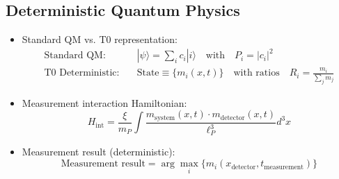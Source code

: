 \documentclass[12pt,a4paper]{article}
\begin{document}
	\subsection{Deterministic Quantum Physics}
	\begin{itemize}
		\item Standard QM vs. T0 representation:
		\begin{align}
			\text{Standard QM:} &\quad |\psi\rangle = \sum_i c_i |i\rangle \quad \text{with} \quad P_i = |c_i|^2 \\
			\text{T0 Deterministic:} &\quad \text{State} \equiv \{m_i(x,t)\} \quad \text{with ratios} \quad R_i = \frac{m_i}{\sum_j m_j}
		\end{align}
		
		\item Measurement interaction Hamiltonian:
		\begin{equation}
			H_{\text{int}} = \frac{\xi}{m_P} \int \frac{m_{\text{system}}(x,t) \cdot m_{\text{detector}}(x,t)}{\ell_P^3} d^3x
		\end{equation}
		
		\item Measurement result (deterministic):
		\begin{equation}
			\text{Measurement result} = \arg\max_i\{m_i(x_{\text{detector}}, t_{\text{measurement}})\}
		\end{equation}
	\end{itemize}
	
\end{document}
